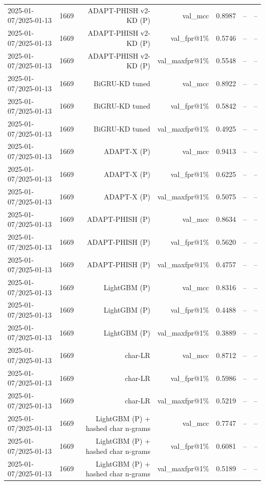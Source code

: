\begin{table}[t]
\begin{tabular}{llrrrrr}
2025-01-07/2025-01-13 & 1669 & ADAPT-PHISH v2-KD (P) & val\_mcc & 0.8987 & -- & -- \\
2025-01-07/2025-01-13 & 1669 & ADAPT-PHISH v2-KD (P) & val\_fpr@1\% & 0.5746 & -- & -- \\
2025-01-07/2025-01-13 & 1669 & ADAPT-PHISH v2-KD (P) & val\_maxfpr@1\% & 0.5548 & -- & -- \\
2025-01-07/2025-01-13 & 1669 & BiGRU-KD tuned & val\_mcc & 0.8922 & -- & -- \\
2025-01-07/2025-01-13 & 1669 & BiGRU-KD tuned & val\_fpr@1\% & 0.5842 & -- & -- \\
2025-01-07/2025-01-13 & 1669 & BiGRU-KD tuned & val\_maxfpr@1\% & 0.4925 & -- & -- \\
2025-01-07/2025-01-13 & 1669 & ADAPT-X (P) & val\_mcc & 0.9413 & -- & -- \\
2025-01-07/2025-01-13 & 1669 & ADAPT-X (P) & val\_fpr@1\% & 0.6225 & -- & -- \\
2025-01-07/2025-01-13 & 1669 & ADAPT-X (P) & val\_maxfpr@1\% & 0.5075 & -- & -- \\
2025-01-07/2025-01-13 & 1669 & ADAPT-PHISH (P) & val\_mcc & 0.8634 & -- & -- \\
2025-01-07/2025-01-13 & 1669 & ADAPT-PHISH (P) & val\_fpr@1\% & 0.5620 & -- & -- \\
2025-01-07/2025-01-13 & 1669 & ADAPT-PHISH (P) & val\_maxfpr@1\% & 0.4757 & -- & -- \\
2025-01-07/2025-01-13 & 1669 & LightGBM (P) & val\_mcc & 0.8316 & -- & -- \\
2025-01-07/2025-01-13 & 1669 & LightGBM (P) & val\_fpr@1\% & 0.4488 & -- & -- \\
2025-01-07/2025-01-13 & 1669 & LightGBM (P) & val\_maxfpr@1\% & 0.3889 & -- & -- \\
2025-01-07/2025-01-13 & 1669 & char-LR & val\_mcc & 0.8712 & -- & -- \\
2025-01-07/2025-01-13 & 1669 & char-LR & val\_fpr@1\% & 0.5986 & -- & -- \\
2025-01-07/2025-01-13 & 1669 & char-LR & val\_maxfpr@1\% & 0.5219 & -- & -- \\
2025-01-07/2025-01-13 & 1669 & LightGBM (P) + hashed char n-grams & val\_mcc & 0.7747 & -- & -- \\
2025-01-07/2025-01-13 & 1669 & LightGBM (P) + hashed char n-grams & val\_fpr@1\% & 0.6081 & -- & -- \\
2025-01-07/2025-01-13 & 1669 & LightGBM (P) + hashed char n-grams & val\_maxfpr@1\% & 0.5189 & -- & -- \\

\end{tabular}
\end{table}
